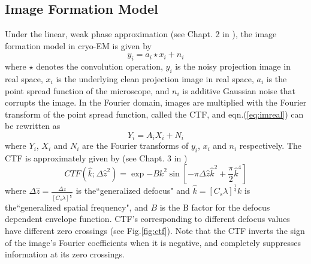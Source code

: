 \documentclass{article}
\begin{document}
\subsection{Image Formation Model}
Under the linear, weak phase approximation (see Chapt. 2 in \cite{frankbook}), the image formation model in cryo-EM is given by
\begin{equation}
y_i = a_i\star x_i + n_i
\label{eq:imreal}
\end{equation}
where $\star$ denotes the convolution operation, $y_i$ is the noisy projection image in real space, $x_i$ is the underlying clean projection image in real space, $a_i$ is the point spread function of the microscope, and $n_i$ is additive Gaussian noise that corrupts the image. In the Fourier domain, images are multiplied with the Fourier transform of the point spread function, called the CTF, and eqn.(\ref{eq:imreal}) can be rewritten as
\begin{equation}
Y_i = A_iX_i + N_i
\label{eq:imfour}
\end{equation}
where $Y_i$, $X_i$ and $N_i$ are the Fourier transforms of $y_i$, $x_i$ and $n_i$ respectively.
The CTF is approximately  given by (see Chapt. 3 in \cite{frankbook})
\begin{equation}
CTF(\hat{k};\Delta\hat{z}^2)= \exp{-Bk^2}\sin[-\pi \Delta\hat{z}\hat{k}^2 + \frac{\pi}{2} \hat{k}^4]
\label{eq:ctf}
\end{equation}
where 
$\Delta\hat{z}=\frac{\Delta z}{[C_s \lambda]^{\frac{1}{2}}}$ is the``generalized defocus" and $\hat{k}=[C_s \lambda]^{\frac{1}{4}}k$ is the``generalized spatial frequency", and $B$ is the B factor for the defocus dependent envelope function. CTF's corresponding to different defocus values have different zero crossings (see Fig.\ref{fig:ctf}). Note that the CTF inverts the sign of the image's Fourier coefficients when it is negative, and completely suppresses information at its zero crossings.
\end{document}
